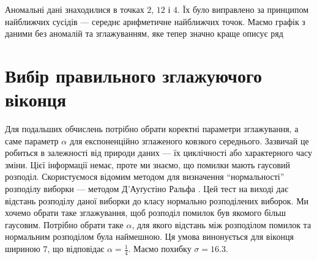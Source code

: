 \begin{center}
\end{center}

\begin{center}
\end{center}

\begin{center}
\end{center}

Аномальні дані знаходилися в точках $2$, $12$ і $4$.
Їх було виправлено за принципом найближчих сусідів ---
середнє арифметичне найближчих точок.
Маємо графік з даними без аномалій та зглажуванням,
яке тепер значно краще описує ряд

\begin{center}
\end{center}

\section{Вибір правильного зглажуючого віконця}

Для подальших обчислень потрібно обрати коректні параметри зглажування,
а саме параметр $\alpha$ для експоненційно зглаженого ковзкого середнього.
Зазвичай це робиться в залежності від природи даних ---
їх циклічності або характерного часу зміни.
Цієї інформації немає, проте ми знаємо, що помилки мають гаусовий розподіл.
Скористуємося відомим методом
для визначення ``нормальності'' розподілу виборки ---
методом Д'Ауґустіно Ральфа \cite{dago1990}.
Цей тест на виході дає відстань розподілу даної виборки
до класу нормально розподілених виборок.
Ми хочемо обрати таке зглажування,
щоб розподіл помилок був якомого більш гаусовим.
Потрібно обрати таке $\alpha$,
для якого відстань між розподілом помилок та нормальним розподілом
була наймешною.
Ця умова винонується для віконця шириною $7$,
що відповідає $\alpha = \frac{1}{4}$.
Маємо похибку $\sigma = 16.3$.

\begin{center}
\end{center}

